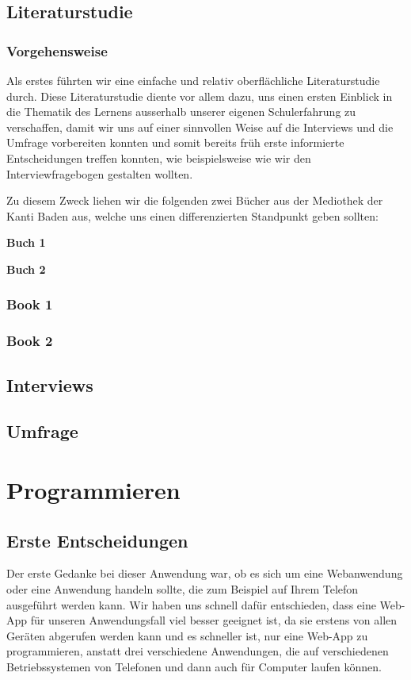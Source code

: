 \documentclass[12pt,a4paper]{report}
\begin{document}
\section{Literaturstudie}
\subsection{Vorgehensweise}
Als erstes führten wir eine einfache und relativ oberflächliche Literaturstudie durch.
Diese Literaturstudie diente vor allem dazu, uns einen ersten Einblick in die Thematik des Lernens ausserhalb unserer eigenen Schulerfahrung zu verschaffen, damit wir uns auf einer sinnvollen Weise auf die Interviews und die Umfrage vorbereiten konnten und somit bereits früh erste informierte Entscheidungen treffen konnten, wie beispielsweise wie wir den Interviewfragebogen gestalten wollten.

Zu diesem Zweck liehen wir die folgenden zwei Bücher aus der Mediothek der Kanti Baden aus, welche uns einen differenzierten Standpunkt geben sollten:
\begin{list}{}
    \item \textbf{Buch 1}
    \item \textbf{Buch 2}
    
\end{list}
\subsection{Book 1}

\subsection{Book 2}
\section{Interviews}

\section{Umfrage}
\chapter{Programmieren}
\section{Erste Entscheidungen}
Der erste Gedanke bei dieser Anwendung war, ob es sich um eine Webanwendung oder eine Anwendung handeln sollte, die zum Beispiel auf Ihrem Telefon ausgeführt werden kann. Wir haben uns schnell dafür entschieden, dass eine Web-App für unseren Anwendungsfall viel besser geeignet ist, da sie erstens von allen Geräten abgerufen werden kann und es schneller ist, nur eine Web-App zu programmieren, anstatt drei verschiedene Anwendungen, die auf verschiedenen Betriebssystemen von Telefonen und dann auch für Computer laufen können.
\end{document}
